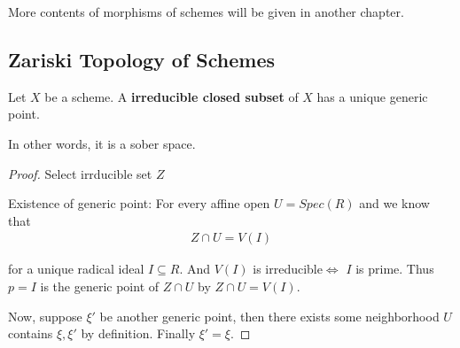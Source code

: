 \documentclass[Total.tex]{subfiles}
\begin{document}
			More contents of morphisms of schemes will be given in another chapter.
		\subsection{Zariski Topology of Schemes}
		
			\begin{lemma}
				Let $X$ be a scheme. A \textbf{irreducible closed subset} of $X$ has a unique generic point.
				
				In other words, it is a sober space.
			\end{lemma}
			
			\begin{proof}
				Select irrducible set $Z$
				
				Existence of generic point: For every affine open $U=Spec(R)$ and we know that
				\begin{gather*}
					Z\cap U=V(I)
				\end{gather*}
				
				for a unique radical ideal $I\subseteq R$. And $V(I)$ is irreducible$\Leftrightarrow$ $I$ is prime. Thus $p=I$ is the generic point of $Z\cap U$ by $Z\cap U=V(I)$.
				
				Now, suppose $\xi'$ be another generic point, then there exists some neighborhood $U$ contains $\xi,\xi'$ by definition. Finally $\xi'=\xi$. 
			\end{proof}
			
\end{document}

